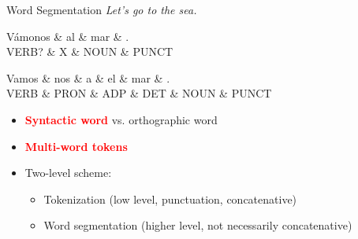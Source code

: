 \documentclass[10pt, compress, aspectratio=169]{beamer}
\renewcommand{\alert}[1]{\textcolor{red}{\textbf{#1}}}
\begin{document}
\begin{frame}{Word Segmentation}
\textit{Let's go to the sea.}

\begin{dependency}[label style={thick, font=\bfseries}]
\begin{deptext}[column sep=3pt, font=\bfseries]
Vámonos \& al \& mar \& . \\[0.1cm]
VERB? \& X \& NOUN \& PUNCT \\
\end{deptext}
\end{dependency}
\begin{dependency}[label style={thick, font=\bfseries}]
\begin{deptext}[font=\bfseries]
Vamos \& nos \& a \& el \& mar \& . \\[0.1cm]
VERB \& PRON \& ADP \& DET \& NOUN \& PUNCT \\
\end{deptext}
\end{dependency}
\begin{itemize}
\item \alert{\textbf{Syntactic word}} vs. orthographic word
\item \alert{\textbf{Multi-word tokens}}
\item Two-level scheme:
\begin{itemize}
\item Tokenization (low level, punctuation, concatenative)
\item Word segmentation (higher level, not necessarily concatenative)
\end{itemize}
\end{itemize}
\end{frame}
\end{document}

